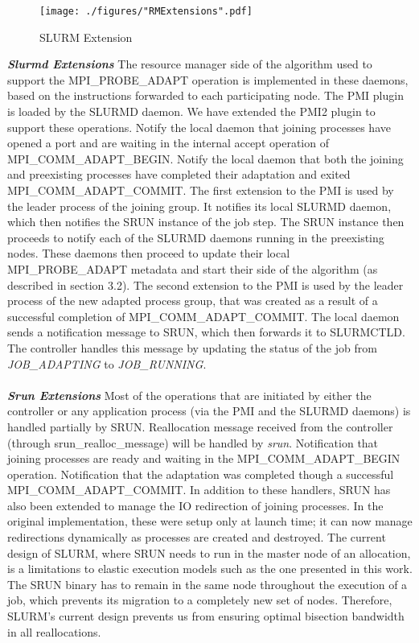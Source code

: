 \begin{figure}[t]
\vspace{-0.60cm}
\texttt{[image: ./figures/"RMExtensions".pdf]}
\caption{SLURM Extension}
\label{fig:1}
\end{figure}
\textbf{\textit{Slurmd Extensions}} The resource manager side of the algorithm used to support the MPI{\_}PROBE{\_}ADAPT operation is implemented in these daemons, based on the instructions forwarded to each participating node. The PMI plugin is loaded by the SLURMD daemon. We have extended the PMI2 plugin to support these operations. Notify the local daemon that joining processes have opened a port and are waiting in the internal accept operation of MPI{\_}COMM{\_}ADAPT{\_}BEGIN. Notify the local daemon that both the joining and preexisting processes have completed their adaptation and exited MPI{\_}COMM{\_}ADAPT{\_}COMMIT. The first extension to the PMI is used by the leader process of the joining group. It notifies its local SLURMD daemon, which then notifies the SRUN instance of the job step. The SRUN instance then proceeds to notify each of the SLURMD daemons running in the preexisting nodes. These daemons then proceed to update their local MPI{\_}PROBE{\_}ADAPT metadata and start their side of the algorithm (as described in section 3.2). The second extension to the PMI is used by the leader process of the new adapted process group, that was created as a result of a successful completion of MPI{\_}COMM{\_}ADAPT{\_}COMMIT. The local daemon sends a notification message to SRUN, which then forwards it to SLURMCTLD. The controller handles this message by updating the status of the job from \textit{JOB{\_}ADAPTING} to \textit{JOB{\_}RUNNING}.\\ \\
\textbf{\textit{Srun Extensions}} Most of the operations that are initiated by either the controller or any application process (via the PMI and the SLURMD daemons) is handled partially by SRUN. Reallocation message received from the controller (through srun{\_}realloc{\_}message) will be handled by \textit{srun}. Notification that joining processes are ready and waiting in the MPI{\_}COMM{\_}ADAPT{\_}BEGIN operation. Notification that the adaptation was completed though a successful MPI{\_}COMM{\_}ADAPT{\_}COMMIT. In addition to these handlers, SRUN has also been extended to manage the IO redirection of joining processes. In the original implementation, these were setup only at launch time; it can now manage redirections dynamically as processes are created and destroyed. The current design of SLURM, where SRUN needs to run in the master node of an allocation, is a limitations to elastic execution models such as the one presented in this work. The SRUN binary has to remain in the same node throughout the execution of a job, which prevents its migration to a completely new set of nodes. Therefore, SLURM's current design prevents us from ensuring optimal bisection bandwidth in all reallocations.

